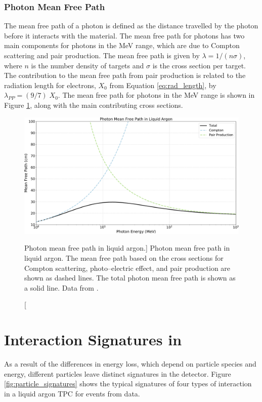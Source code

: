 \subsubsection*{Photon Mean Free Path}
The mean free path of a photon is defined as the distance travelled by the
photon before it interacts with the material. The mean free path for photons
has two main components for photons in the MeV range, which are due to Compton
scattering and pair production. The mean free path is given by $\lambda = 1 / (n
\sigma)$, where $n$ is the number density of targets and $\sigma$ is the cross
section per target. The contribution to the mean free path from pair production
is related to the radiation length for electrons, $X_0$ from Equation
\ref{eq:rad_length}, by $\lambda_{PP} = (9/7) \; X_0$\cite{PhysRevD.98.030001}.
The mean free path for photons in the MeV range is shown in Figure
\ref{fig:photon_mfp}, along with the main contributing cross sections. 

\begin{figure}

	\centering

	\includegraphics[width=\textwidth]{figures/photon_mfp.pdf}

	\caption
	[Photon mean free path in liquid argon.]
	{Photon mean free path in liquid argon. The mean free path based on the cross
	sections for Compton scattering, photo--electric effect, and pair production 
	are shown as dashed lines. The total photon mean free path is shown as a 
	solid line. Data from \cite{photon_xsection}.}

	\label{fig:photon_mfp}

\end{figure}

\section{Interaction Signatures in \protodune{}}
As a result of the differences in energy loss, which depend on particle species
and energy, different particles leave distinct signatures in the detector.  
Figure \ref{fig:particle_signatures} shows the typical signatures of four 
types of interaction in a liquid argon TPC for events from \protodune{} 
data.

